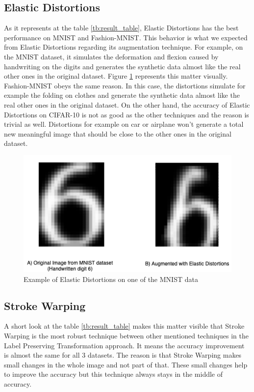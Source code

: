 \subsection{Elastic Distortions}
As it represents at the table \ref{tb:result_table}, Elastic Distortions has the best performance on MNIST and Fashion-MNIST. This behavior is what we expected from Elastic Distortions regarding its augmentation technique. For example, on the MNIST dataset, it simulates the deformation and flexion caused by handwriting on the digits and generates the synthetic data almost like the real other ones in the original dataset. Figure \ref{fig:Elastic_Distortion_Example} represents this matter visually. Fashion-MNIST obeys the same reason. In this case, the distortions simulate for example the folding on clothes and generate the synthetic data almost like the real other ones in the original dataset. On the other hand, the accuracy of Elastic Distortions on CIFAR-10 is not as good as the other techniques and the reason is trivial as well. Distortions for example on car or airplane won't generate a total new meaningful image that should be close to the other ones in the original dataset.

\begin{figure}
  \centering
  \label{fig:Elastic_Distortion_Example}
  \includegraphics[width=1\textwidth]{fig/result/Elastic-Distortions-Example}
  \caption{Example of Elastic Distortions on one of the MNIST data}
\end{figure}

\subsection{Stroke Warping}
A short look at the table \ref{tb:result_table} makes this matter visible that Stroke Warping is the most robust technique between other mentioned techniques in the Label Preserving Transformation approach. It means the accuracy improvement is almost the same for all $3$ datasets. The reason is that Stroke Warping makes small changes in the whole image and not part of that. These small changes help to improve the accuracy but this technique always stays in the middle of accuracy.



